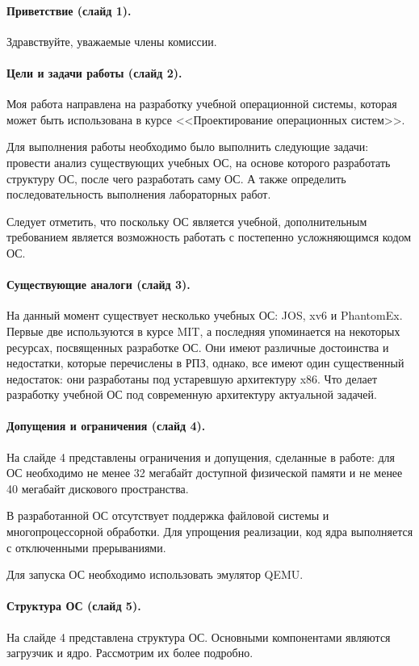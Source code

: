 \documentclass[12pt]{article}
\begin{document}
\paragraph{Приветствие (слайд 1).}
Здравствуйте, уважаемые члены комиссии.


\paragraph{Цели и задачи работы (слайд 2).}
Моя работа направлена на разработку учебной операционной системы, которая может
быть использована в курсе <<Проектирование операционных систем>>.

Для выполнения работы необходимо было выполнить следующие задачи: провести
анализ существующих учебных ОС, на основе которого разработать
структуру ОС, после чего разработать саму ОС. А также определить
последовательность выполнения лабораторных работ.

Следует отметить, что поскольку ОС является учебной, дополнительным требованием
является возможность работать с постепенно усложняющимся кодом ОС.


\paragraph{Существующие аналоги (слайд 3).}
На данный момент существует несколько учебных ОС: JOS, xv6 и PhantomEx. Первые две
используются в курсе MIT, а последняя упоминается на некоторых ресурсах, посвященных
разработке ОС. Они имеют различные достоинства и недостатки, которые перечислены в РПЗ,
однако, все имеют один существенный недостаток: они разработаны под устаревшую архитектуру x86.
Что делает разработку учебной ОС под современную архитектуру актуальной задачей.


\paragraph{Допущения и ограничения (слайд 4).}
На слайде 4 представлены ограничения и допущения, сделанные в работе: для ОС необходимо
не менее 32 мегабайт доступной физической памяти и не менее 40 мегабайт дискового пространства.

В разработанной ОС отсутствует поддержка файловой системы и многопроцессорной обработки.
Для упрощения реализации, код ядра выполняется с отключенными прерываниями.

Для запуска ОС необходимо использовать эмулятор QEMU.


\paragraph{Структура ОС (слайд 5).}
На слайде 4 представлена структура ОС. Основными компонентами являются загрузчик и ядро.
Рассмотрим их более подробно.
\end{document}
